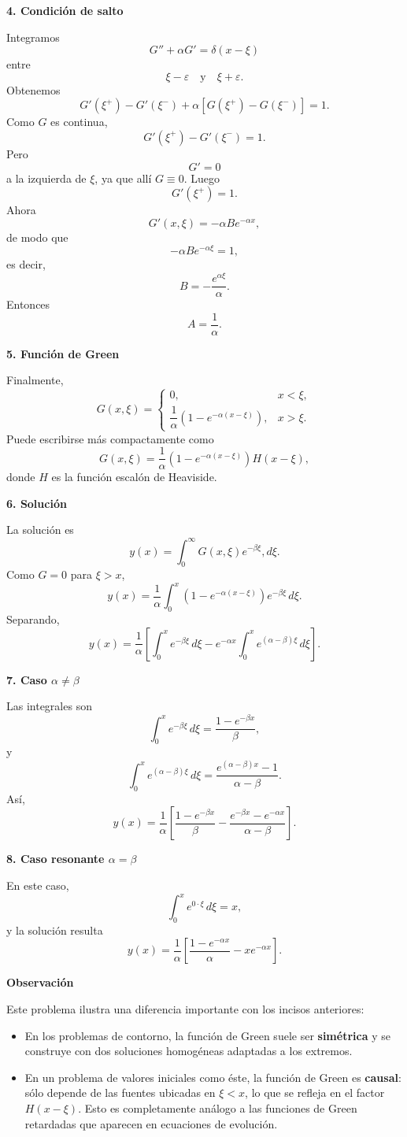 \documentclass[11pt,spanish]{article}
\newcounter{problema}
\begin{document}
{\bf 4. Condición de salto}

Integramos
$$
G''+\alpha G'
=
\delta(x-\xi)
$$
entre
$$
\xi-\varepsilon
\quad\text{y}\quad
\xi+\varepsilon.
$$
Obtenemos
$$
G'(\xi^+)-G'(\xi^-)
+
\alpha
\left[
G(\xi^+)-G(\xi^-)
\right]
=1.
$$
Como $G$ es continua,
$$
G'(\xi^+)-G'(\xi^-)=1.
$$
Pero
$$
G'=0
$$
a la izquierda de $\xi$, ya que allí $G\equiv0$.
Luego
$$
G'(\xi^+)=1.
$$
Ahora
$$
G'(x,\xi)
=
-\alpha B e^{-\alpha x},
$$
de modo que
$$
-\alpha B e^{-\alpha\xi}=1,
$$
es decir,
$$
B
=
-\frac{e^{\alpha\xi}}{\alpha}.
$$
Entonces
$$
A=\frac1\alpha.
$$

{\bf 5. Función de Green}

Finalmente,
$$
\boxed{
G(x,\xi)
=
\begin{cases}
0,
&
x<\xi,\\
\dfrac1\alpha
\left(
1-e^{-\alpha(x-\xi)}
\right),
&
x>\xi.
\end{cases}
}
$$
Puede escribirse más compactamente como
$$
\boxed{
G(x,\xi)
=
\frac1\alpha
\left(
1-e^{-\alpha(x-\xi)}
\right)
H(x-\xi),
}
$$
donde $H$ es la función escalón de Heaviside.

{\bf 6. Solución}

La solución es
$$
y(x)
=
\int_0^\infty
G(x,\xi)e^{-\beta\xi},d\xi.
$$
Como $G=0$ para $\xi>x$,
$$
y(x)
=
\frac1\alpha
\int_0^x
\left(
1-e^{-\alpha(x-\xi)}
\right)
e^{-\beta\xi}\,d\xi.
$$
Separando,
$$
y(x)
=
\frac1\alpha
\left[
\int_0^x e^{-\beta\xi}\,d\xi
-
e^{-\alpha x}
\int_0^x
e^{(\alpha-\beta)\xi}\,d\xi
\right].
$$

{\bf 7. Caso $\alpha\neq\beta$}

Las integrales son
$$
\int_0^x e^{-\beta\xi}\,d\xi
=
\frac{1-e^{-\beta x}}{\beta},
$$
y
$$
\int_0^x
e^{(\alpha-\beta)\xi}\,d\xi
=
\frac{e^{(\alpha-\beta)x}-1}
{\alpha-\beta}.
$$
Así,
$$
\boxed{
y(x)
=
\frac1\alpha
\left[
\frac{1-e^{-\beta x}}{\beta}
-
\frac{e^{-\beta x}-e^{-\alpha x}}
{\alpha-\beta}
\right].
}
$$

{\bf 8. Caso resonante $\alpha=\beta$}

En este caso,
$$
\int_0^x e^{0\cdot\xi}\,d\xi=x,
$$
y la solución resulta
$$
\boxed{
y(x)
=
\frac1\alpha
\left[
\frac{1-e^{-\alpha x}}{\alpha}
-
xe^{-\alpha x}
\right].
}
$$

{\bf Observación}

Este problema ilustra una diferencia importante con los incisos anteriores:
\begin{itemize}
\item En los problemas de contorno, la función de Green suele ser {\bf simétrica} y se construye con dos soluciones homogéneas adaptadas a los extremos.
\item En un problema de valores iniciales como éste, la función de Green es {\bf causal}: sólo depende de las fuentes ubicadas en $\xi<x$, lo que se refleja en el factor $H(x-\xi)$. Esto es completamente análogo a las funciones de Green retardadas que aparecen en ecuaciones de evolución.
\end{itemize}
\end{document}
